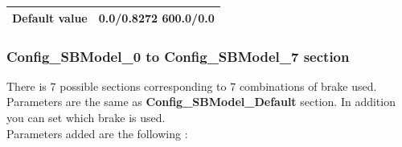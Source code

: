 \begin{itemize}
\begin{longtable}{|l|l|}
			\hline
			
			\begin{minipage}[t]{0.22\linewidth} \textbf{Default value}	\end{minipage}
			&	\begin{minipage}[t]{0.78\linewidth} 0.0/0.8272 600.0/0.0 \end{minipage} \\
			
			\hline
		\end{longtable}
		
	\end{itemize}
	
\subsubsection{Config\_SBModel\_0 to Config\_SBModel\_7 section}

	There is 7 possible sections corresponding to 7 combinations of brake used.
	Parameters are the same as \textbf{Config\_SBModel\_Default} section. In addition you can set which brake is used.
	\\
	Parameters added are the following :
	
